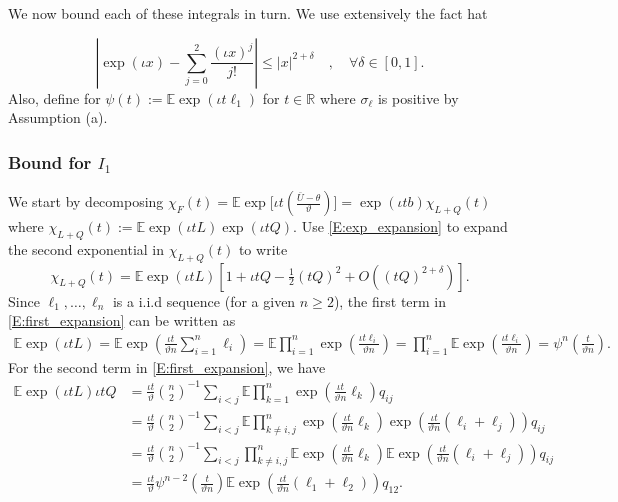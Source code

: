 \documentclass[11pt]{article}
\numberwithin{equation}{section}
\theoremstyle{definition}
\newcommand{\E}{\mathbb{E}}
\newcommand{\R}{\mathbb{R}}
\newcommand{\Scale}{\vartheta}
\begin{document}
We now bound each of these integrals in turn. We use extensively the fact hat 
 
 \begin{equation}\label{E:exp_expansion}
\left|\exp(\iota x) - \sum_{j=0}^2\frac{(\iota x)^j}{j!} \right|\leq  |x|^{2+\delta}\quad , \quad \forall \delta\in[0,1].
\end{equation}
Also, define for $\psi(t) := \E \exp(\iota t\ell_1)$ for $t\in\R$ where $\sigma_\ell$ is positive by Assumption (a).

\subsubsection*{Bound for $I_1$}

We start by decomposing $\chi_F(t) =\E\exp\big[\iota t (\frac{\bar{U}-\theta}{\Scale})\big]=\exp(\iota t b)\chi_{L+Q}(t)$ where $\chi_{L+Q}(t) := \E\exp (\iota tL) \exp (\iota tQ)$. Use  \eqref{E:exp_expansion} to expand the second exponential in $\chi_{L+Q}(t)$ to write
\begin{equation}\label{E:first_expansion}
\chi_{L+Q}(t) = \E\exp (\iota tL)[1 + \iota tQ -\tfrac{1}{2}(tQ)^2 + O((tQ)^{2+\delta})].
\end{equation}
Since $\ell_1,\dots,\ell_n$ is a i.i.d sequence (for a given $n\geq 2$), the first term in \eqref{E:first_expansion} can be written as
\begin{align*}
\E\exp (\iota tL) = \E\exp \left(\frac{\iota t}{\Scale n}\sum_{i=1}^n \ell_i\right)= \E\prod_{i=1}^n\exp \left(\frac{\iota t\ell_i}{\Scale n}\right)= \prod_{i=1}^n \E\exp \left(\frac{\iota t\ell_i}{\Scale n}\right)= \psi^n\left(\frac{t}{\Scale n}\right).
\end{align*}
For the second term in \eqref{E:first_expansion}, we have
\begin{align*}
\E\exp (\iota tL)\iota tQ &= \frac{\iota t}{\Scale}\binom{n}{2}^{-1}\sum_{i<j}\E\prod_{k=1}^n\exp \left(\frac{\iota t}{\Scale n}\ell_k\right)q_{ij}\\
&= \frac{\iota t}{\Scale}\binom{n}{2}^{-1}\sum_{i<j}\E\prod_{k\neq i,j}^n\exp \left(\frac{\iota t}{\Scale n}\ell_k\right)\exp\left(\frac{\iota t}{\Scale n}(\ell_i+\ell_j)\right)q_{ij}\\
&= \frac{\iota t}{\Scale}\binom{n}{2}^{-1}\sum_{i<j}\prod_{k\neq i,j}^n\E\exp \left(\frac{\iota t}{\Scale n}\ell_k\right)\E\exp\left(\frac{\iota t}{\Scale n}(\ell_i+\ell_j)\right)q_{ij}\\
&= \frac{\iota t}{\Scale}\psi^{n-2}\left(\tfrac{t}{\Scale n}\right)\E\exp\left(\frac{\iota t}{\Scale n}(\ell_1+\ell_2)\right)q_{12}.
\end{align*}
\end{document}
